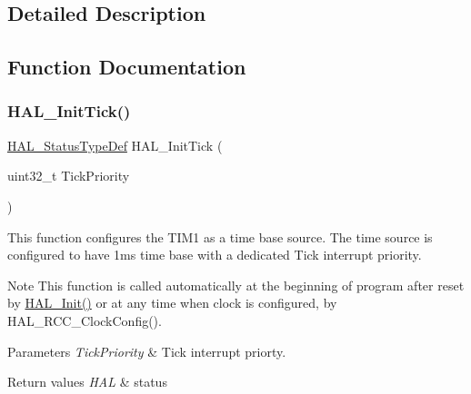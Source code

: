 \subsection{Detailed Description}


\subsection{Function Documentation}
\mbox{\label{group___h_a_l___time_base_ga879cdb21ef051eb81ec51c18147397d5}} 
\subsubsection{\texorpdfstring{H\+A\+L\+\_\+\+Init\+Tick()}{HAL\_InitTick()}}
{\footnotesize\ttfamily \mbox{\hyperlink{stm32f4xx__hal__def_8h_a63c0679d1cb8b8c684fbb0632743478f}{H\+A\+L\+\_\+\+Status\+Type\+Def}} H\+A\+L\+\_\+\+Init\+Tick (\begin{DoxyParamCaption}\item[{uint32\+\_\+t}]{Tick\+Priority }\end{DoxyParamCaption})}



This function configures the T\+I\+M1 as a time base source. The time source is configured to have 1ms time base with a dedicated Tick interrupt priority. 

\begin{DoxyNote}{Note}
This function is called automatically at the beginning of program after reset by \mbox{\hyperlink{group___h_a_l___exported___functions___group1_gaecac54d350c3730e6831eb404e557dc4}{H\+A\+L\+\_\+\+Init()}} or at any time when clock is configured, by H\+A\+L\+\_\+\+R\+C\+C\+\_\+\+Clock\+Config(). 
\end{DoxyNote}

\begin{DoxyParams}{Parameters}
{\em Tick\+Priority} & Tick interrupt priorty. \\
\hline
\end{DoxyParams}

\begin{DoxyRetVals}{Return values}
{\em H\+AL} & status \\
\hline
\end{DoxyRetVals}
\mbox{\label{group___h_a_l___time_base_ga24e0ee9dae1ec0f9d19200f5575ff790}} 
